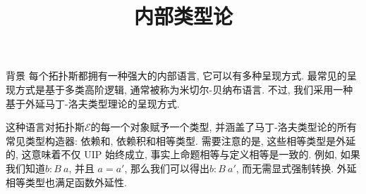 \documentclass[aspectratio=169,xcolor=dvipsnames]{beamer}
\title{内部类型论}
\date{}
\newcommand\calE{\mathcal{E}}
\begin{document}
\begin{frame}
    \titlepage
\end{frame}

\begin{frame}{背景}
  每个拓扑斯都拥有一种强大的内部语言, 它可以有多种呈现方式. 最常见的呈现方式是基于多类高阶逻辑, 通常被称为米切尔-贝纳布语言. 不过, 我们采用一种基于外延马丁-洛夫类型理论的呈现方式.

  \bigskip

  这种语言对拓扑斯$\calE$的每一个对象赋予一个类型, 并涵盖了马丁-洛夫类型论的所有常见类型构造器: 依赖和, 依赖积和相等类型. 需要注意的是, 这些相等类型是外延的, 这意味着不仅 UIP 始终成立, 事实上命题相等与定义相等是一致的. 例如, 如果我们知道$b : B\:a$, 并且 $a=a'$, 那么我们可以得出$b:B\:a'$, 而无需显式强制转换. 外延相等类型也满足函数外延性.
\end{frame}
\end{document}
